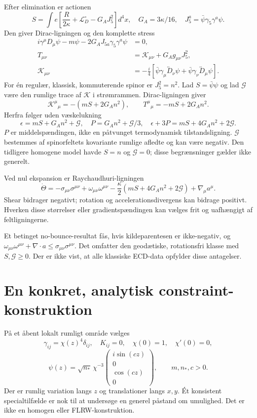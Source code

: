 \documentclass[11pt,a4paper]{article}
\begin{document}
Efter elimination er actionen
\[
 S=\int e\left[\frac R{2\kappa}+\mathcal L_D^\circ-G_AJ_5^2\right]d^4x,
 \quad G_A=3\kappa/16,\quad J_5^a=\bar\psi\gamma_5\gamma^a\psi.
\]
Den giver Dirac-ligningen og den komplette stress
\begin{align*}
 i\gamma^\mu D_\mu\psi-m\psi-2G_AJ_{5a}\gamma_5\gamma^a\psi&=0,\\
 T_{\mu\nu}&=\mathcal K_{\mu\nu}+G_Ag_{\mu\nu}J_5^2,\\
 \mathcal K_{\mu\nu}&=-\frac i4[\bar\psi\gamma_\mu\overleftrightarrow D_\nu\psi+
 \bar\psi\gamma_\nu\overleftrightarrow D_\mu\psi].
\end{align*}
For én regulær, klassisk, kommuterende spinor er $J_5^2=n^2$. Lad $S=\bar\psi\psi$ og lad $\mathcal G$ være den rumlige trace af $\mathcal K$ i strømrammen. Dirac-ligningen giver
\[
 \mathcal K^\mu{}_{\mu}=-(mS+2G_A n^2),\qquad
 T^\mu{}_{\mu}=-mS+2G_A n^2.
\]
Herfra følger uden væskelukning
\[
 \boxed{\epsilon=mS+G_A n^2+\mathcal G,\quad
 P=G_A n^2+\mathcal G/3,\quad
 \epsilon+3P=mS+4G_A n^2+2\mathcal G.}
\]
$P$ er middelspændingen, ikke en påtvunget termodynamisk tilstandsligning. $\mathcal G$ bestemmes af spinorfeltets kovariante rumlige afledte og kan være negativ. Den tidligere homogene model havde $S=n$ og $\mathcal G=0$; disse begrænsninger gælder ikke generelt.

Ved nul ekspansion er Raychaudhuri-ligningen
\[
 \dot\Theta=-\sigma_{\mu\nu}\sigma^{\mu\nu}+\omega_{\mu\nu}\omega^{\mu\nu}
 -\frac\kappa2(mS+4G_A n^2+2\mathcal G)+\nabla_\mu a^\mu.
\]
Shear bidrager negativt; rotation og accelerationsdivergens kan bidrage positivt. Hverken disse størrelser eller gradientspændingen kan vælges frit og uafhængigt af feltligningerne.

Et betinget no-bounce-resultat fås, hvis kildeparentesen er ikke-negativ, og $\omega_{\mu\nu}\omega^{\mu\nu}+\nabla\cdot a\leq\sigma_{\mu\nu}\sigma^{\mu\nu}$. Det omfatter den geodætiske, rotationsfri klasse med $S,\mathcal G\geq0$. Der er ikke vist, at alle klassiske ECD-data opfylder disse antagelser.

\section{En konkret, analytisk constraint-konstruktion}
På et åbent lokalt rumligt område vælges
\[
 \gamma_{ij}=\chi(z)^4\delta_{ij},\quad K_{ij}=0,\quad\chi(0)=1,\quad\chi'(0)=0,
\]
\[
 \psi(z)=\sqrt{n_*}\,\chi^{-3}
 \begin{pmatrix}i\sin(cz)\\0\\\cos(cz)\\0\end{pmatrix},\qquad m,n_*,c>0.
\]
Der er rumlig variation langs $z$ og translationer langs $x,y$. Ét konsistent specialtilfælde er nok til at undersøge en generel påstand om umulighed. Det er ikke en homogen eller FLRW-konstruktion.
\end{document}
